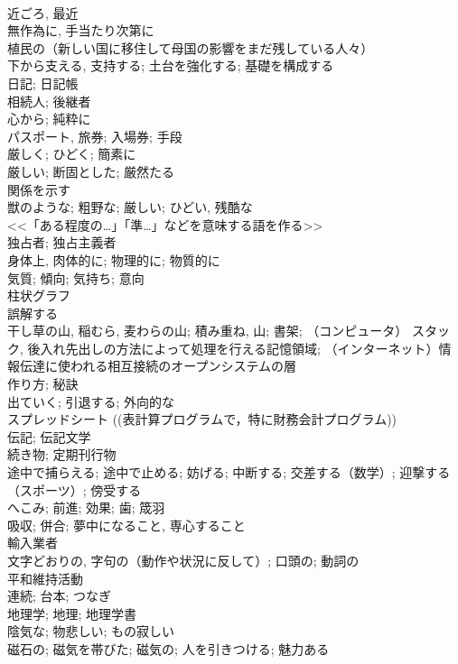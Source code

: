 \documentclass[8pt]{extreport}
\begin{document}
\begin{CJK}{UTF8}{min}
\\	近ごろ, 最近	
\\	無作為に, 手当たり次第に	
\\	植民の（新しい国に移住して母国の影響をまだ残している人々）	
\\	下から支える, 支持する; 土台を強化する; 基礎を構成する	
\\	日記; 日記帳	
\\	相続人; 後継者	
\\	心から; 純粋に	
\\	パスポート, 旅券; 入場券; 手段	
\\	厳しく; ひどく; 簡素に	
\\	厳しい; 断固とした; 厳然たる	
\\	関係を示す	
\\	獣のような; 粗野な; 厳しい; ひどい, 残酷な	
\\	<<「ある程度の…」「準…」などを意味する語を作る>>	
\\	独占者; 独占主義者	
\\	身体上, 肉体的に; 物理的に; 物質的に	
\\	気質; 傾向; 気持ち; 意向	
\\	柱状グラフ	
\\	誤解する	
\\	干し草の山, 稲むら, 麦わらの山; 積み重ね, 山; 書架; （コンピュータ） スタック, 後入れ先出しの方法によって処理を行える記憶領域; （インターネット）情報伝達に使われる相互接続のオープンシステムの層	
\\	作り方; 秘訣	
\\	出ていく; 引退する; 外向的な	
\\	スプレッドシート ((表計算プログラムで，特に財務会計プログラム))	
\\	伝記; 伝記文学	
\\	続き物; 定期刊行物	
\\	途中で捕らえる; 途中で止める; 妨げる; 中断する; 交差する（数学）; 迎撃する（スポーツ）; 傍受する	
\\	へこみ; 前進; 効果; 歯; 筬羽	
\\	吸収; 併合; 夢中になること, 専心すること	
\\	輸入業者	
\\	文字どおりの, 字句の（動作や状況に反して）; 口頭の; 動詞の	
\\	平和維持活動	
\\	連続; 台本; つなぎ	
\\	地理学; 地理; 地理学書	
\\	陰気な; 物悲しい; もの寂しい	
\\	磁石の; 磁気を帯びた; 磁気の; 人を引きつける; 魅力ある	

\end{CJK}
\end{document}
